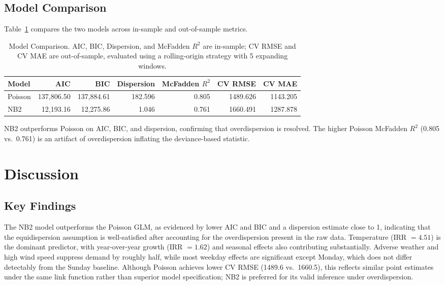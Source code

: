 \documentclass[12pt, a4paper]{article}
\begin{document}
\subsection{Model Comparison}
Table~\ref{tab:model_compare} compares the two models across in-sample
and out-of-sample metrics.

\begin{table}[H]
    \centering
    \caption{Model Comparison. AIC, BIC, Dispersion, and McFadden $R^2$
    are in-sample; CV RMSE and CV MAE are out-of-sample, evaluated using
    a rolling-origin strategy with 5 expanding windows.}
    \label{tab:model_compare}
    \begin{tabular}{lrrrrrr}
        \toprule
        \textbf{Model} & \textbf{AIC} & \textbf{BIC} & \textbf{Dispersion} & \textbf{McFadden $R^2$} & \textbf{CV RMSE} & \textbf{CV MAE} \\
        \midrule
        Poisson & 137,806.50 & 137,884.61 & 182.596 & 0.805 & 1489.626 & 1143.205 \\
        NB2     &  12,193.16 &  12,275.86 &   1.046 & 0.761 & 1660.491 & 1287.878 \\
        \bottomrule
    \end{tabular}
\end{table}

NB2 outperforms Poisson on AIC, BIC, and dispersion, confirming that
overdispersion is resolved. The higher Poisson McFadden $R^2$ (0.805
vs.\ 0.761) is an artifact of overdispersion inflating the deviance-based
statistic.




\section{Discussion}

\subsection{Key Findings}

The NB2 model outperforms the Poisson GLM, as evidenced by lower AIC and
BIC and a dispersion estimate close to 1, indicating that the
equidispersion assumption is well-satisfied after accounting for the
overdispersion present in the raw data. Temperature (IRR $= 4.51$) is
the dominant predictor, with year-over-year growth (IRR $= 1.62$) and
seasonal effects also contributing substantially. Adverse weather and
high wind speed suppress demand by roughly half, while most weekday
effects are significant except Monday, which does not differ detectably
from the Sunday baseline. Although Poisson achieves lower CV RMSE
(1489.6 vs.\ 1660.5), this reflects similar point estimates under the
same link function rather than superior model specification; NB2 is
preferred for its valid inference under overdispersion.
\end{document}
